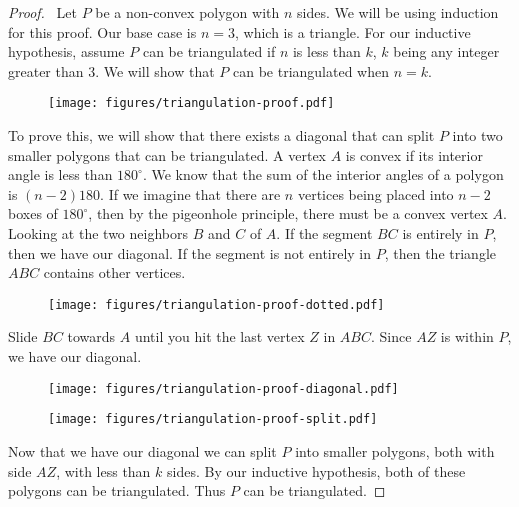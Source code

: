 \documentclass[10pt]{amsart}
\begin{document}
\begin{proof} \
    Let $P$ be a non-convex polygon with $n$ sides. We will be using induction for this proof. 
    Our base case is $n = 3$, which is a triangle. 
    For our inductive hypothesis, assume $P$ can be triangulated if $n$ is less than $k$, $k$ being 
    any integer greater than 3. 
    We will show that $P$ can be triangulated when $n = k$.
    \begin{figure}[h!]
        \centering
        \texttt{[image: figures/triangulation-proof.pdf]}
    \end{figure}

    \vspace{-20pt}
    To prove this, we will show that there exists a diagonal that can split $P$ into 
    two smaller polygons that can be triangulated. 
    A vertex $A$ is convex if its interior angle is less than $180^\circ$. We know that 
    the sum of the interior angles of a polygon is $(n-2)180$.  
    If we imagine that there are $n$ vertices being placed into $n-2$ boxes of $180^\circ$, 
    then by the pigeonhole principle, there must be a convex vertex $A$. 
    Looking at the two neighbors $B$ and $C$ of $A$. 
    If the segment $BC$ is entirely in $P$, then we have our diagonal. 
    If the segment is not entirely in $P$, then the triangle $ABC$ contains other vertices. 

    \begin{figure}[h!]
        \centering
        \texttt{[image: figures/triangulation-proof-dotted.pdf]}
    \end{figure}

    Slide $BC$ towards $A$ until you hit the last vertex $Z$ in $ABC$. 
    Since $AZ$ is within $P$, we have our diagonal. 

    \begin{figure}[h!]
        \begin{minipage}{.5\textwidth}
            \centering
            \texttt{[image: figures/triangulation-proof-diagonal.pdf]}            
        \end{minipage}%
        \begin{minipage}{.5\textwidth}
            \centering
            \texttt{[image: figures/triangulation-proof-split.pdf]}            
        \end{minipage}
    \end{figure}

    Now that we have our diagonal we can split $P$ into smaller polygons, both with side $AZ$, 
    with less than $k$ sides. 
    By our inductive hypothesis, both of these polygons can be triangulated. 
    Thus $P$ can be triangulated.
\end{proof}
\end{document}
